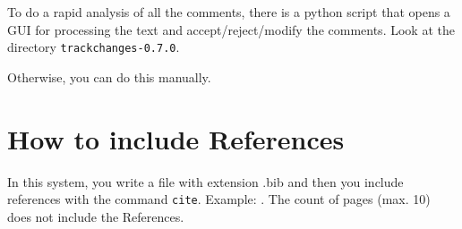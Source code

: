 \documentclass[12pt]{article}
\begin{document}
To do a rapid analysis of all the comments, there is a python script that opens a GUI for processing the text and accept/reject/modify the comments. Look at the directory {\tt trackchanges-0.7.0}. 

Otherwise, you can do this manually.

\section{How to include References}

In this system, you write a file with extension .bib and then you include references with the command \texttt{cite}. Example: \cite{example2025}. The count of pages (max. 10) does not include the References.

\newpage
{}


\end{document}
